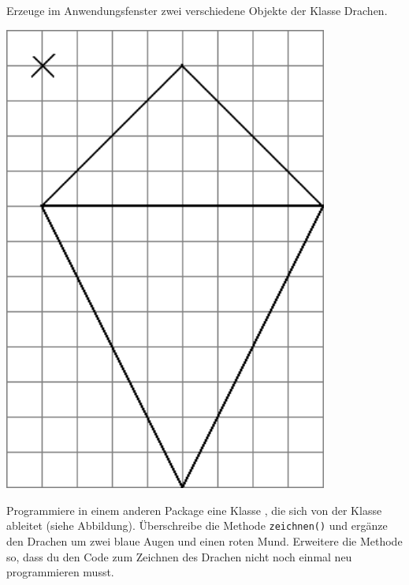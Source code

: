 \begin{compactenum}[a)]
\begin{minipage}{0.6\textwidth}
Erzeuge im Anwendungsfenster zwei verschiedene Objekte der
Klasse Drachen.
\end{minipage}
\hfill
\begin{minipage}{0.3\textwidth}
\includegraphics[width=0.8\textwidth]{./inf/SEKII/16_Java_Vererbung/Aufgabe4a.png}
\end{minipage}

\begin{minipage}{0.6\textwidth}
\item Programmiere in einem anderen Package eine Klasse
, die sich von der Klasse  ableitet
(siehe Abbildung). Überschreibe die Methode \verb|zeichnen()| und ergänze den
Drachen um zwei blaue Augen und einen roten Mund. Erweitere die Methode so,
dass du den Code zum Zeichnen des Drachen nicht noch einmal neu
programmieren musst.


\end{minipage}
\end{compactenum}
